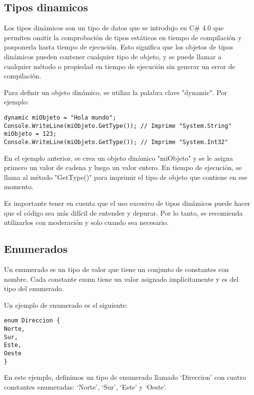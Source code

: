 \documentclass[executivepaper]{article}
\begin{document}
\subsection*{Tipos dinamicos}

Los tipos dinámicos son un tipo de datos que se introdujo en C\# 4.0 que permiten omitir la comprobación de tipos estáticos en tiempo de compilación y posponerla hasta tiempo de ejecución. Esto significa que los objetos de tipos dinámicos pueden contener cualquier tipo de objeto, y se puede llamar a cualquier método o propiedad en tiempo de ejecución sin generar un error de compilación.

Para definir un objeto dinámico, se utiliza la palabra clave "dynamic". Por ejemplo:

\begin{lstlisting}
dynamic miObjeto = "Hola mundo";
Console.WriteLine(miObjeto.GetType()); // Imprime "System.String"
miObjeto = 123;
Console.WriteLine(miObjeto.GetType()); // Imprime "System.Int32"
\end{lstlisting}

En el ejemplo anterior, se crea un objeto dinámico "miObjeto" y se le asigna primero un valor de cadena y luego un valor entero. En tiempo de ejecución, se llama al método "GetType()" para imprimir el tipo de objeto que contiene en ese momento.

Es importante tener en cuenta que el uso excesivo de tipos dinámicos puede hacer que el código sea más difícil de entender y depurar. Por lo tanto, se recomienda utilizarlos con moderación y solo cuando sea necesario.

\subsection{Enumerados}

Un enumerado es un tipo de valor que tiene un conjunto de constantes con nombre. Cada constante enum tiene un valor asignado implícitamente y es del tipo del enumerado.

Un ejemplo de enumerado es el siguiente:

\begin{lstlisting}
enum Direccion {
Norte,
Sur,
Este,
Oeste
}
\end{lstlisting}

En este ejemplo, definimos un tipo de enumerado llamado \enquote*{Direccion} con cuatro constantes enumeradas: \enquote*{Norte}, \enquote*{Sur}, \enquote*{Este} y \enquote*{Oeste}.
\end{document}
